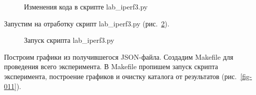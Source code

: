 \documentclass[
  english,
  russian,
  12pt,
  a4paper,
  DIV=11,
  numbers=noendperiod]{scrreprt}
\begin{document}
\begin{figure}


\caption{\label{fig-009}Изменения кода в скрипте lab\_iperf3.py}

\end{figure}%

Запустим на отработку скрипт lab\_iperf3.py (рис.~\ref{fig-010}).

\begin{figure}


\caption{\label{fig-010}Запуск скрипта lab\_iperf3.py}

\end{figure}%

Построим графики из получившегося JSON-файла. Создадим Makefile для
проведения всего эксперимента. В Makefile пропишем запуск скрипта
эксперимента, построение графиков и очистку каталога от результатов
(рис.~\ref{fig-011}).
\end{document}
